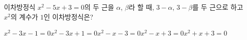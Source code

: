 이차방정식 $x^2-5x+3=0$의 두 근을 $\alpha$, $\beta$라 할 때, $3-\alpha$, $3-\beta$를 두 근으로 하고 $x^2$의 계수가 $1$인 이차방정식은?
\begin{choicesii}{$x^2-3x-1=0$}{$x^2-3x+1=0$}{$x^2-x-3=0$}{$x^2-x+3=0$}{$x^2+x+3=0$}\end{choicesii}
